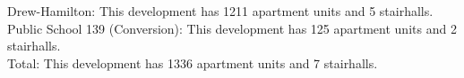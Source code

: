 {Drew-Hamilton}: This development has 1211 apartment units and 5 stairhalls.\\{Public School 139 (Conversion)}: This development has 125 apartment units and 2 stairhalls.\\{Total}: This development has 1336 apartment units and 7 stairhalls.\\